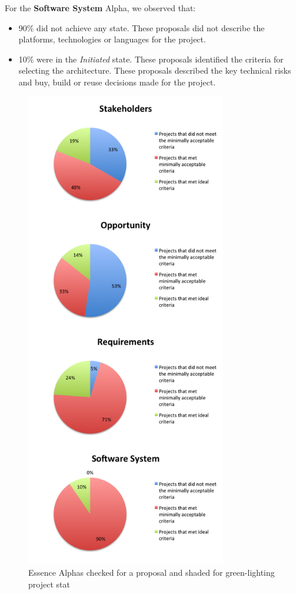 \documentclass[conference]{IEEEtran}
\begin{document}
For the \textbf{Software System} Alpha, we observed that:
\begin{itemize}
\itemsep1pt\parskip0pt
\item
  90\% did not achieve any state. These proposals did not describe the
  platforms, technologies or languages for the project.
\item
  10\% were in the \textit{Initiated} state. These proposals identified the
  criteria for selecting the architecture. These proposals described the key technical risks and buy, build or reuse decisions made for the project.
\end{itemize}

\begin{figure}[!t]
\centering
\includegraphics[width=3.45in]{ProposalAlphasChartsStacked.png}
\caption{Essence Alphas checked for a proposal and shaded for green-lighting project stat}
\label{ProposalChart}
\end{figure}
\end{document}
